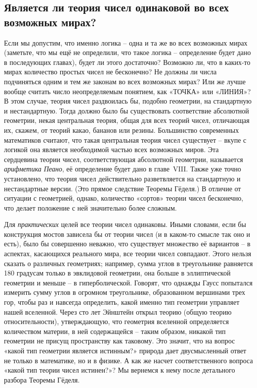 \documentclass[../main.tex]{subfiles}
\begin{document}
\subsection{Является ли теория чисел одинаковой во всех возможных мирах?}

Если мы допустим, что именно логика \--- одна и та же во всех возможных мирах (заметьте, что мы ещё не определили, что такое логика \--- определение будет дано в последующих главах), будет ли этого достаточно? Возможно ли, что в каких-то мирах количество простых чисел не бесконечно? Не должны ли числа подчиняться одним и тем же законам во всех возможных мирах? Или же лучше вообще считать число неопределяемым понятием, как «ТОЧКА» или «ЛИНИЯ»? В этом случае, теория чисел раздвоилась бы, подобно геометрии, на стандартную и нестандартную. Тогда должно было бы существовать соответствие абсолютной геометрии, некая центральная теория, общая для всех теорий чисел, отличающая их, скажем, от теорий какао, бананов или резины. Большинство современных математиков считают, что такая центральная теория чисел существует \--- вкупе с логикой она является необходимой частью всех возможных миров. Эта сердцевина теории чисел, соответствующая абсолютной геометрии, называется \emph{арифметика Пеано}, её определение будет дано в главе~VIII. Также уже точно установлено, что теория чисел действительно разветвляется на стандартную и нестандартные версии. (Это прямое следствие Теоремы Гёделя.) В отличие от ситуации с геометрией, однако, количество «сортов» теории чисел бесконечно, что делает положение с ней значительно более сложным.

Для \emph{практических} целей все теории чисел одинаковы. Иными словами, если бы конструкция мостов зависела бы от теории чисел (и в каком-то смысле так оно и есть), было бы совершенно неважно, что существует множество её вариантов \--- в аспектах, касающихся реального мира, все теории чисел совпадают. Этого нельзя сказать о различных геометриях; например, сумма углов в треугольнике равняется 180 градусам только в эвклидовой геометрии, она больше в эллиптической геометрии и меньше \--- в гиперболической. Говорят, что однажды Гаусс попытался измерить сумму углов в огромном треугольнике, образованном вершинами трех гор, чтобы раз и навсегда определить, какой именно тип геометрии управляет нашей вселенной. Через сто лет Эйнштейн открыл теорию (общую теорию относительности), утверждающую, что геометрия вселенной определяется количеством материи, в ней содержащейся \--- таким образом, никакой тип геометрии не присущ пространству как таковому. Это значит, что на вопрос «какой тип геометрии является истинным?» природа дает двусмысленный ответ не только в математике, но и в физике. А как же насчет соответственного вопроса «какой тип теории чисел истинен?»? Мы вернемся к нему после детального разбора Теоремы Гёделя.
\end{document}
